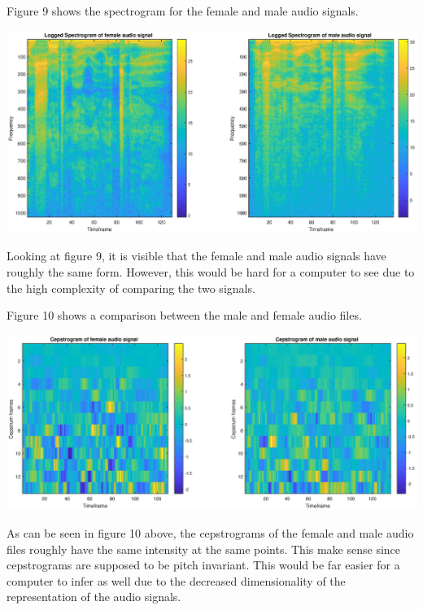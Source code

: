 \documentclass[]{article}
\let\origfigure\figure
\let\endorigfigure\endfigure
\renewenvironment{figure}[1][2] {
    \expandafter\origfigure\expandafter[H]
} {
    \endorigfigure
}
\begin{document}
Figure 9 shows the spectrogram for the female and male audio signals.

\begin{figure}
\centering
\includegraphics{Result_Pics/female_male_spetgram.eps}
\caption{Spectrograms of female and male audio signals}
\end{figure}

Looking at figure 9, it is visible that the female and male audio
signals have roughly the same form. However, this would be hard for a
computer to see due to the high complexity of comparing the two signals.

Figure 10 shows a comparison between the male and female audio files.

\begin{figure}
\centering
\includegraphics{Result_Pics/cepgram_male_female.eps}
\caption{Cepstrograms of male and female audio signals}
\end{figure}

As can be seen in figure 10 above, the cepstrograms of the female and
male audio files roughly have the same intensity at the same points.
This make sense since cepstrograms are supposed to be pitch invariant.
This would be far easier for a computer to infer as well due to the
decreased dimensionality of the representation of the audio signals.
\end{document}
